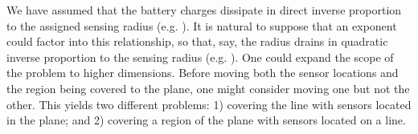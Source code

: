 \documentclass[11pt]{article}
\begin{document}
We have assumed that the battery charges dissipate in direct
inverse proportion to the assigned sensing radius (e.g. ). It is natural to suppose that an exponent could factor into
this relationship, so that, say, the radius drains in quadratic
inverse proportion to the sensing radius (e.g. ).
One could expand the scope of the problem to higher
dimensions. Before moving both the sensor locations and the
region being covered to the plane, one might consider moving one but
not the other. This yields two different problems: 1) covering the
line with sensors located in the plane; and 2) covering a region of
the plane with sensors located on a line.











\end{document}
